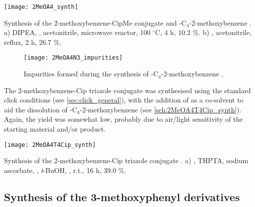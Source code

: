 \begin{scheme}[H]
	\begin{center}
		\texttt{[image: 2MeOA4\_synth]}
		\caption{Synthesis of the 2-methoxybenzene-CipMe conjugate  and -C$_4$-2-methoxybenzene . 
		a)  DIPEA, , acetonitrile, microwave reactor, 100 $^{\circ}$C, 4 h, 10.2 \%.
		b) , acetonitrile, reflux, 2 h, 26.7 \%.  \label{sch:2MeOA4_synth}}
	\end{center}
\end{scheme}


\begin{figure}[H]
	\begin{center}
		\texttt{[image: 2MeOA4N3\_impurities]}
		\caption{Impurities formed during the synthesis of -C$_4$-2-methoxybenzene .
		\label{fig:2MeOA4N3_impurities}}
	\end{center}
\end{figure}

The 2-methoxybenzene-Cip triazole conjugate  was synthesised using the standard click conditions  (see \ref{sec:click_general}), with the addition of  as a co-solvent to aid the dissolution of -C$_4$-2-methoxybenzene  (see \ref{sch:2MeOA4T4Cip_synth}). Again, the yield was somewhat low, probably due to air/light sensitivity of the starting material and/or product.

\begin{scheme}[H]
	\begin{center}
				\texttt{[image: 2MeOA4T4Cip\_synth]}
		\caption{Synthesis of the 2-methoxybenzene-Cip triazole conjugate . 
		a) , THPTA, sodium ascorbate, , \textit{t}-BuOH, , r.t., 16 h, 39.0 \%.\label{sch:2MeOA4T4Cip_synth}}
	\end{center}
\end{scheme}

\subsection{Synthesis of the 3-methoxyphenyl derivatives}

